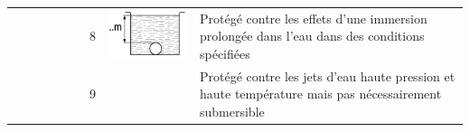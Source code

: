 \begin{landscape}
\begin{xltabular}{\linewidth}{p{0.3cm} m{2cm} X p{0.3cm} m{2cm} X p{0.3cm} m{2.2cm} X}
		&  & 	& 	& & & 8 & 	\includegraphics[scale=1.1]{X8.png}	&	Protégé contre les effets d'une immersion prolongée dans l'eau dans des conditions spécifiées \\
		&  & 	& 	& & & 9 & 	&	Protégé contre les jets d'eau haute pression et haute température mais pas nécessairement submersible \\
\end{xltabular}	

\end{landscape}

%

